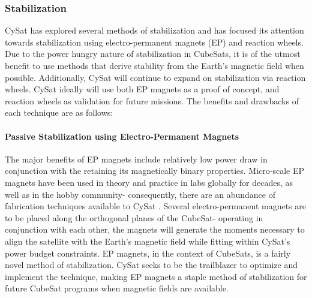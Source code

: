 \documentclass[nocover]            %
{CSLI}                       %
\begin{document}
\subsubsection{Stabilization}
CySat has explored several methods of stabilization and has focused its attention towards stabilization using electro-permanent magnets (EP) and reaction wheels. Due to the power hungry nature of stabilization in CubeSats, it is of the utmost benefit to use methods that derive stability from the Earth's magnetic field when possible. Additionally, CySat will continue to expand on stabilization via reaction wheels. CySat ideally will use both EP magnets as a proof of concept, and reaction wheels as validation for future missions. The benefits and drawbacks of each technique are as follows:
\paragraph{Passive Stabilization using Electro-Permanent Magnets\\}
The major benefits of EP magnets include relatively low power draw in conjunction with the retaining its magnetically binary properties. Micro-scale EP magnets have been used in theory and practice in labs globally for decades, as well as in the hobby community- consequently, there are an abundance of fabrication techniques available to CySat . Several electro-permanent magnets are to be placed along the orthogonal planes of the CubeSat- operating in conjunction with each other, the magnets will generate the moments necessary to align the satellite with the Earth's magnetic field while fitting within CySat's power budget constraints. EP magnets, in the context of CubeSats, is a fairly novel method of stabilization. CySat seeks to be the trailblazer to optimize and implement the technique, making EP magnets a staple method of stabilization for future CubeSat programs when magnetic fields are available.
\end{document}
